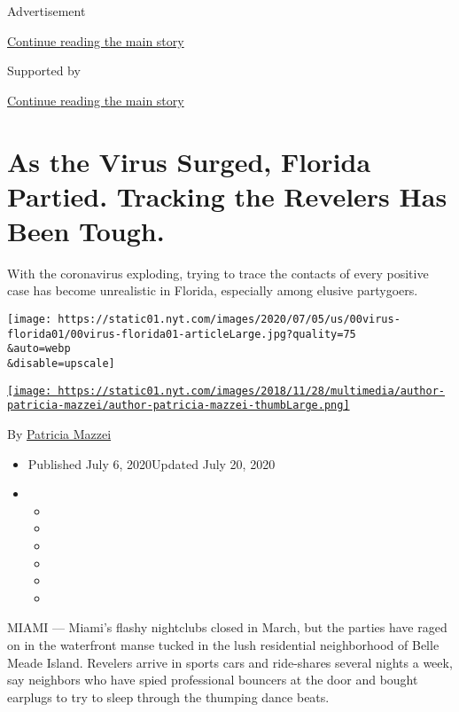 Advertisement

\protect\hyperlink{after-top}{Continue reading the main story}

Supported by

\protect\hyperlink{after-sponsor}{Continue reading the main story}

\hypertarget{as-the-virus-surged-florida-partied-tracking-the-revelers-has-been-tough}{%
\section{As the Virus Surged, Florida Partied. Tracking the Revelers Has
Been
Tough.}\label{as-the-virus-surged-florida-partied-tracking-the-revelers-has-been-tough}}

With the coronavirus exploding, trying to trace the contacts of every
positive case has become unrealistic in Florida, especially among
elusive partygoers.

\texttt{[image: https://static01.nyt.com/images/2020/07/05/us/00virus-florida01/00virus-florida01-articleLarge.jpg?quality=75\\\&auto=webp\\\&disable=upscale]}

\href{https://www.nytimes.com/by/patricia-mazzei}{\texttt{[image: https://static01.nyt.com/images/2018/11/28/multimedia/author-patricia-mazzei/author-patricia-mazzei-thumbLarge.png]}}

By \href{https://www.nytimes.com/by/patricia-mazzei}{Patricia Mazzei}

\begin{itemize}
\item
  Published July 6, 2020Updated July 20, 2020
\item
  \begin{itemize}
  \item
  \item
  \item
  \item
  \item
  \item
  \end{itemize}
\end{itemize}

MIAMI --- Miami's flashy nightclubs closed in March, but the parties
have raged on in the waterfront manse tucked in the lush residential
neighborhood of Belle Meade Island. Revelers arrive in sports cars and
ride-shares several nights a week, say neighbors who have spied
professional bouncers at the door and bought earplugs to try to sleep
through the thumping dance beats.

